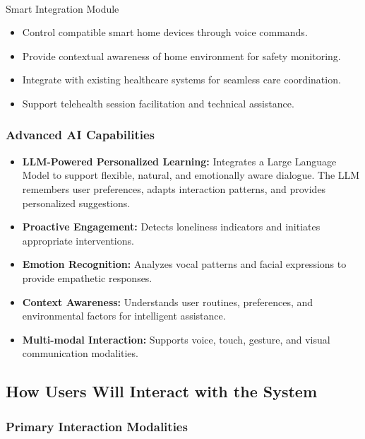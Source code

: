 \documentclass[
  letterpaper,
  DIV=11,
  numbers=noendperiod]{scrartcl}
\makeatletter
\let\oldparagraph\paragraph
\renewcommand{\paragraph}{
    \@ifstar
      \xxxParagraphStar
      \xxxParagraphNoStar
  }
\newcommand{\xxxParagraphStar}[1]{\oldparagraph*{#1}\mbox{}}
\newcommand{\xxxParagraphNoStar}[1]{\oldparagraph{#1}\mbox{}}
\providecommand{\tightlist}{%
  \setlength{\itemsep}{0pt}\setlength{\parskip}{0pt}}\usepackage{longtable,booktabs,array}
\makeatother
\begin{document}
\paragraph{Smart Integration Module}\label{smart-integration-module}

\begin{itemize}
\tightlist
\item
  Control compatible smart home devices through voice commands.
\item
  Provide contextual awareness of home environment for safety
  monitoring.
\item
  Integrate with existing healthcare systems for seamless care
  coordination.
\item
  Support telehealth session facilitation and technical assistance.
\end{itemize}

\subsubsection{Advanced AI Capabilities}\label{advanced-ai-capabilities}

\begin{itemize}
\tightlist
\item
  \textbf{LLM-Powered Personalized Learning:} Integrates a Large
  Language Model to support flexible, natural, and emotionally aware
  dialogue. The LLM remembers user preferences, adapts interaction
  patterns, and provides personalized suggestions.
\item
  \textbf{Proactive Engagement:} Detects loneliness indicators and
  initiates appropriate interventions.
\item
  \textbf{Emotion Recognition:} Analyzes vocal patterns and facial
  expressions to provide empathetic responses.
\item
  \textbf{Context Awareness:} Understands user routines, preferences,
  and environmental factors for intelligent assistance.
\item
  \textbf{Multi-modal Interaction:} Supports voice, touch, gesture, and
  visual communication modalities.
\end{itemize}

\subsection{How Users Will Interact with the
System}\label{how-users-will-interact-with-the-system}

\subsubsection{Primary Interaction
Modalities}\label{primary-interaction-modalities}
\end{document}
